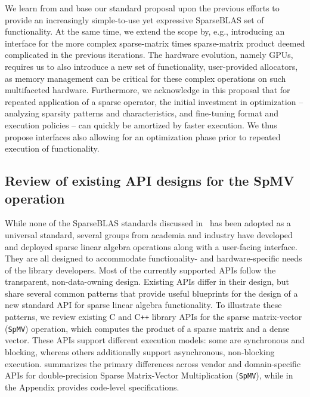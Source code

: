 \documentclass[manuscript,review]{acmart}
\newcommand{\cplusplus}{C\texttt{++}\xspace}
\begin{document}
We learn from and base our standard proposal upon the previous efforts to provide an
increasingly simple-to-use yet expressive SparseBLAS set of functionality. At
the same time, we extend the scope by, e.g., introducing an interface for
the more complex sparse-matrix times sparse-matrix product deemed
complicated in the previous iterations. The hardware evolution, namely GPUs,
requires us to also introduce a new set of functionality, user-provided allocators, as memory
management can be critical for these complex operations on such multifaceted
hardware. 
Furthermore, we acknowledge in this proposal that for repeated application of a sparse operator, the initial investment in optimization -- analyzing sparsity patterns and characteristics, and fine-tuning format and execution policies -- can quickly be amortized by faster execution. We thus propose interfaces also allowing for an optimization phase prior to repeated execution of functionality.



\subsection{Review of existing API designs for the SpMV operation}
\label{sec:spmvReview}
While none of the SparseBLAS standards discussed in~ has been adopted as a universal standard, several groups from academia and industry have developed and deployed sparse linear algebra operations along with a user-facing interface. They are all designed to accommodate functionality- and hardware-specific needs of the library developers. Most of the currently supported APIs follow the transparent, non-data-owning design. 
Existing APIs differ in their design, but share several common patterns that provide useful blueprints for the design of a new standard API for sparse linear algebra functionality. To illustrate these patterns, we review existing C and \cplusplus library APIs for the sparse matrix-vector (\texttt{SpMV}) operation, which computes the product of a sparse matrix and a dense vector. These APIs support different execution models: some are synchronous and blocking, whereas others additionally support asynchronous, non-blocking execution.
 summarizes the primary differences across vendor and domain-specific APIs for double-precision Sparse Matrix-Vector Multiplication (\texttt{SpMV}), while  in the Appendix provides code-level specifications.
\end{document}

